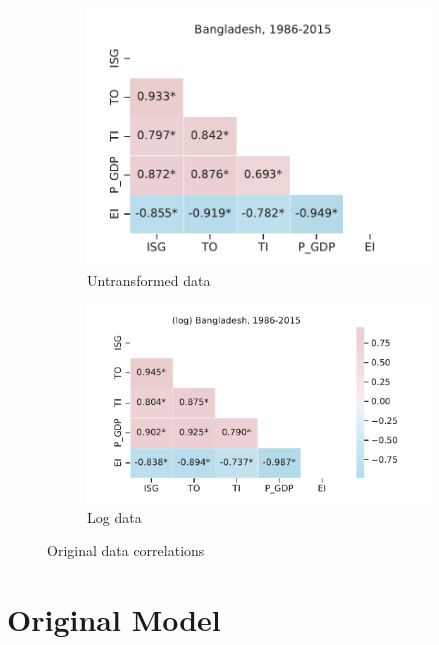 \documentclass[11pt,a4paper]{article}
\begin{document}
\begin{figure}[tbp]
\centering
\begin{subfigure}{0.43\textwidth}
\includegraphics[width=\textwidth]{./plots/BGD_201805_correlations.pdf}
\caption{Untransformed data}
\end{subfigure}%
\begin{subfigure}{0.57\textwidth}
\includegraphics[width=\textwidth]{./plots/BGD_201805_correlations_log.pdf}
\caption{Log data}
\end{subfigure}
\caption{Original data correlations}
\label{fig:original_summary_corr}
\end{figure}

\clearpage

\section{Original Model}\label{sec:original_model}
\end{document}
